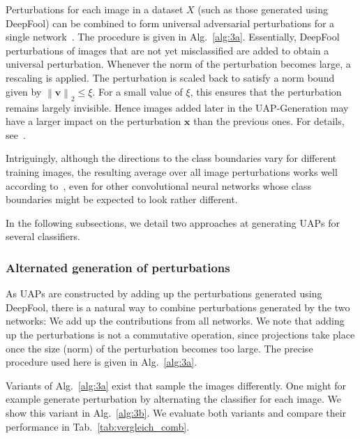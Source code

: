\documentclass[runningheads]{llncs}
\newcommand{\xb}{\ensuremath{\mathbf{x}}}
\begin{document}
Perturbations for each image in a dataset \(X\) (such as those generated using DeepFool) can be combined to form universal adversarial perturbations for a single network~\cite{moosavidezfooli_universal_2017}. The procedure is given in Alg.~\ref{alg:3a}. Essentially, DeepFool perturbations of images that are not yet misclassified are added to obtain a universal perturbation. 
Whenever the norm of the perturbation becomes large, a rescaling is applied. The perturbation is scaled back to satisfy a norm bound given by \(\left\|\mathbf{v}\right\|_2\leq\xi\). For a small value of \(\xi\), this ensures that the perturbation remains largely invisible. Hence images added later in the UAP-Generation may have a larger impact on the perturbation $\xb$ than the previous ones. For details, see~\cite{moosavidezfooli_universal_2017}. 

Intriguingly, although the directions to the class boundaries vary for different training images, the resulting average over all image perturbations works well according to~\cite{moosavidezfooli_universal_2017}, even for other convolutional neural networks whose class boundaries might be expected to look rather different. 

In the following subsections, we detail two approaches at generating UAPs for several classifiers.

\subsubsection{Alternated generation of perturbations}
As UAPs are constructed by adding up the perturbations generated using DeepFool, there is a natural way to combine perturbations generated by the two networks: We add up the contributions from all networks. We note that adding up the perturbations is not a commutative operation, since projections take place once the size (norm) of the perturbation becomes too large. The precise procedure used here is given in Alg.~\ref{alg:3a}. 

Variants of Alg.~\ref{alg:3a} exist that sample the images differently. One might for example generate perturbation by alternating the classifier for each image. We show this variant in Alg.~\ref{alg:3b}. We evaluate both variants and compare their performance in Tab.~\ref{tab:vergleich_comb}. 
 
\end{document}
